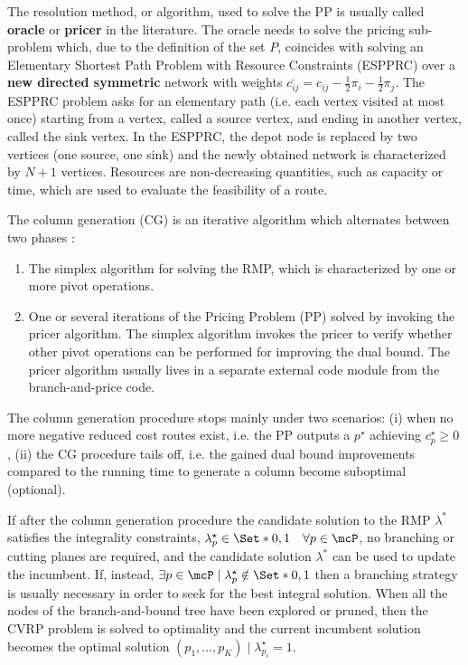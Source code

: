 \medskip

The resolution method, or algorithm,
used to solve the PP is usually called \textbf{oracle} or \textbf{pricer} in the literature.
The oracle needs to solve the pricing sub-problem which, due to the definition of the set $P$,
coincides with solving an Elementary Shortest Path Problem with Resource Constraints (ESPPRC)
over a \textbf{new directed symmetric} network with weights
$\bar{c_{ij}} = c_{ij} - \frac{1}{2} \pi_i - \frac{1}{2} \pi_j$.
The ESPPRC problem asks for an elementary path (i.e. each vertex visited at most once) starting
from a vertex, called a source vertex, and ending in another vertex, called the sink vertex.
In the ESPPRC, the depot node is replaced by two vertices (one source, one sink)
and the newly obtained network is characterized by $N + 1$ vertices.
Resources are non-decreasing quantities,
such as capacity or time,
which are used to evaluate
the feasibility of a route.

\medskip

The column generation (CG) is an iterative algorithm which alternates between two phases \parencite{desaulniers2018}:
\begin{enumerate}
	\setlength{\itemsep}{0pt}
	\setlength{\parskip}{0pt}

	\item The simplex algorithm for solving the RMP, which is characterized by one or more pivot operations.
	\item One or several iterations of the Pricing Problem (PP) solved by invoking the pricer algorithm.
	      The simplex algorithm invokes the pricer to verify whether other pivot operations
	      can be performed for improving the dual bound.
	      The pricer algorithm usually lives in a separate external code module from the branch-and-price code.
\end{enumerate}

The column generation procedure stops mainly under two scenarios:
(i) when no more negative reduced cost routes exist,
i.e. the PP outputs a $p^\star$ achieving $c^\star_p \ge 0$,
(ii) the CG procedure tails off,
i.e. the gained dual bound improvements
compared to the running time to generate a column
become suboptimal (optional).

If after the column generation procedure
the candidate solution to the RMP $\lambda^*$ satisfies the integrality constraints,
$\lambda^\star_p \in \Set*{0, 1} \quad \forall p \in \mcP$,
no branching or cutting planes are required,
and the candidate solution $\lambda^*$ can be used to update the incumbent.
If, instead,
$\exists p \in \mcP \mid \lambda^\star_p \notin \Set*{0, 1}$
then a branching strategy is usually necessary
in order to seek for the best integral solution.
When all the nodes of the branch-and-bound tree have been explored or pruned,
then the CVRP problem is solved to optimality
and the current incumbent solution becomes the optimal solution
$(p_1, \dots, p_K) \mid \lambda^\star_{p_i} = 1$.

